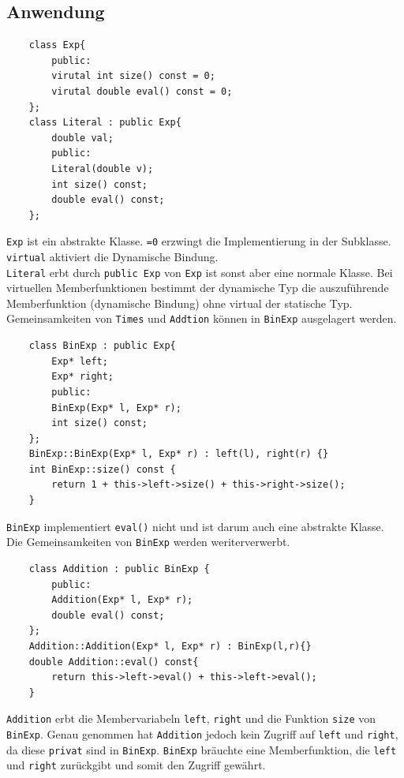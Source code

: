 \subsection{Anwendung}
\begin{lstlisting}
	class Exp{
		public:
		virutal int size() const = 0;
		virutal double eval() const = 0;
	};
	class Literal : public Exp{
		double val;
		public:
		Literal(double v);
		int size() const;
		double eval() const;
	};
\end{lstlisting}
\texttt{Exp} ist ein abstrakte Klasse. \texttt{=0} erzwingt die Implementierung in der Subklasse. \texttt{virtual} aktiviert die Dynamische Bindung.\\
\texttt{Literal} erbt durch \texttt{public Exp} von \texttt{Exp} ist sonst aber eine normale Klasse.
Bei virtuellen Memberfunktionen bestimmt der dynamische Typ die auszuführende Memberfunktion (dynamische Bindung)  ohne virtual der statische Typ.
Gemeinsamkeiten von \texttt{Times} und \texttt{Addtion} können in \texttt{BinExp} ausgelagert werden.
\begin{lstlisting}
	class BinExp : public Exp{
		Exp* left;
		Exp* right;
		public:
		BinExp(Exp* l, Exp* r);
		int size() const;
	};
	BinExp::BinExp(Exp* l, Exp* r) : left(l), right(r) {}
	int BinExp::size() const {
		return 1 + this->left->size() + this->right->size();
	}
\end{lstlisting}
\texttt{BinExp} implementiert \texttt{eval()} nicht und ist darum auch eine abstrakte Klasse. Die Gemeinsamkeiten von \texttt{BinExp} werden weriterverwerbt.
\begin{lstlisting}
	class Addition : public BinExp {
		public:
		Addition(Exp* l, Exp* r);
		double eval() const;
	};
	Addition::Addition(Exp* l, Exp* r) : BinExp(l,r){}
	double Addition::eval() const{
		return this->left->eval() + this->left->eval();
	}
\end{lstlisting}
\texttt{Addition} erbt die Membervariabeln \texttt{left}, \texttt{right} und die Funktion \texttt{size} von \texttt{BinExp}. Genau genommen hat \texttt{Addition} jedoch kein Zugriff auf \texttt{left} und \texttt{right}, da diese \texttt{privat} sind in \texttt{BinExp}. \texttt{BinExp} bräuchte eine Memberfunktion, die \texttt{left} und \texttt{right} zurückgibt und somit den Zugriff gewährt. 




